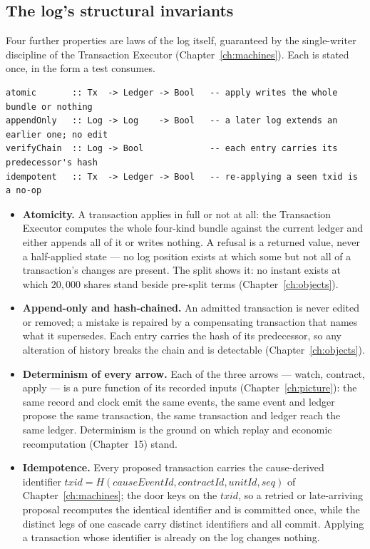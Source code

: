 \subsection{The log's structural invariants}

Four further properties are laws of the log itself, guaranteed by the
single-writer discipline of the Transaction Executor (Chapter~\ref{ch:machines}).
Each is stated once, in the form a test consumes.

\begin{lstlisting}
atomic       :: Tx  -> Ledger -> Bool   -- apply writes the whole bundle or nothing
appendOnly   :: Log -> Log    -> Bool   -- a later log extends an earlier one; no edit
verifyChain  :: Log -> Bool             -- each entry carries its predecessor's hash
idempotent   :: Tx  -> Ledger -> Bool   -- re-applying a seen txid is a no-op
\end{lstlisting}

\begin{itemize}[leftmargin=1.4em,itemsep=2pt]
\item \textbf{Atomicity.} A transaction applies in full or not at all: the
  Transaction Executor computes the whole four-kind bundle against the current
  ledger and either appends all of it or writes nothing. A refusal is a returned
  value, never a half-applied state --- no log position exists at which some but
  not all of a transaction's changes are present. The split shows it: no instant
  exists at which $20{,}000$ shares stand beside pre-split terms
  (Chapter~\ref{ch:objects}).
\item \textbf{Append-only and hash-chained.} An admitted transaction is never
  edited or removed; a mistake is repaired by a compensating transaction that
  names what it supersedes. Each entry carries the hash of its predecessor, so
  any alteration of history breaks the chain and is detectable
  (Chapter~\ref{ch:objects}).
\item \textbf{Determinism of every arrow.} Each of the three arrows --- watch,
  contract, apply --- is a pure function of its recorded inputs
  (Chapter~\ref{ch:picture}): the same record and clock emit the same events, the
  same event and ledger propose the same transaction, the same transaction and
  ledger reach the same ledger. Determinism is the ground on which replay and
  economic recomputation (Chapter~15) stand.
\item \textbf{Idempotence.} Every proposed transaction carries the cause-derived
  identifier $\mathit{txid}=H(\mathit{causeEventId},\mathit{contractId},\mathit{unitId},\mathit{seq})$
  of Chapter~\ref{ch:machines}; the door keys on the $\mathit{txid}$, so a retried or
  late-arriving proposal recomputes the identical identifier and is committed once,
  while the distinct legs of one cascade carry distinct identifiers and all commit.
  Applying a transaction whose identifier is already on the log changes nothing.
\end{itemize}

